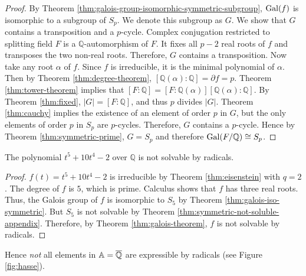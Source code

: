 \begin{proof}
	By Theorem \ref{thm:galois-group-isomorphic-symmetric-subgroup}, $\operatorname{Gal}(f)$ is isomorphic to a subgroup of $S_p$. We denote this subgroup as $G$. We show that $G$ contains a transposition and a $p$-cycle. Complex conjugation restricted to splitting field $F$ is a $\mathbb Q$-automorphism of $F$. It fixes all $p - 2$ real roots of $f$ and transposes the two non-real roots. Therefore, $G$ contains a transposition. Now
	take any root $\alpha$ of $f$. Since $f$ is irreducible, it is the minimal polynomial of $\alpha$. Then by Theorem \ref{thm:degree-theorem}, $[\mathbb Q(\alpha) : \mathbb Q] = \partial f = p. $ Theorem \ref{thm:tower-theorem} implies that $[F : \mathbb Q] = [F : \mathbb Q(\alpha)] [ \mathbb Q(\alpha) : \mathbb Q]. $ By Theorem \ref{thm:fixed}, $|G| = [F : \mathbb Q]$, and thus $p$ divides $|G|$. Theorem \ref{thm:cauchy} implies the existence of an element of order $p$ in $G$, but the only elements of order $p$ in $S_p$ are $p$-cycles. Therefore, $G$ contains a $p$-cycle. Hence by Theorem \ref{thm:symmetric-prime}, $ G = S_p$ and therefore $\operatorname{Gal}(F / \mathbb Q) \cong S_p$.
\end{proof}

\begin{example}
	The polynomial $t^5 + 10 t^4 - 2$ over $\mathbb Q$ is not solvable by radicals.
\end{example}

\begin{proof}
	$f(t) = t^5 + 10 t^4 - 2$ is irreducible by Theorem \ref{thm:eisenstein} with $q = 2$. The degree of $f$ is $5$, which is prime. Calculus shows that $f$ has three real roots. Thus, the Galois group of $f$ is isomorphic to $S_5$ by Theorem \ref{thm:galois-iso-symmetric}. But $S_5$ is not solvable by Theorem \ref{thm:symmetric-not-soluble-appendix}. Therefore, by Theorem \ref{thm:galois-theorem}, $f$ is not solvable by radicals.
\end{proof}

Hence \textit{not} all elements in $\mathbb A = \overline {\mathbb Q}$ are expressible by radicals (see Figure \ref{fig:hasse}). 

